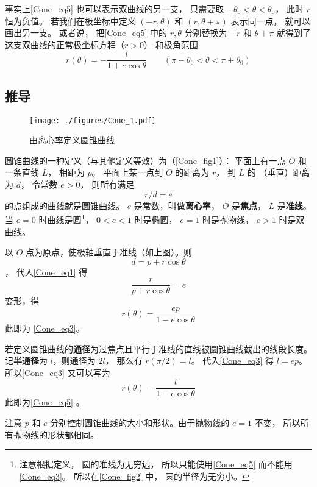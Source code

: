 事实上\autoref{Cone_eq5} 也可以表示双曲线的另一支， 只需要取 $-\theta_0< \theta < \theta_0$， 此时 $r$ 恒为负值。 若我们在极坐标中定义 $(-r, \theta)$ 和 $(r, \theta + \pi)$ 表示同一点， 就可以画出另一支。 或者说， 把\autoref{Cone_eq5} 中的  $r,\theta$ 分别替换为 $-r$ 和 $\theta+\pi$ 就得到了这支双曲线的正常极坐标方程（$r > 0$） 和极角范围
\begin{equation}\label{Cone_eq6}
r(\theta) = -\frac{l}{1 + e\cos\theta} \qquad (\pi - \theta_0<\theta < \pi + \theta_0)
\end{equation}

\subsection{推导}

\begin{figure}[ht]
\centering
\texttt{[image: ./figures/Cone\_1.pdf]}
\caption{由离心率定义圆锥曲线}\label{Cone_fig1}
\end{figure}

圆锥曲线的一种定义（与其他定义等效）为（\autoref{Cone_fig1}）：
平面上有一点 $O$ 和一条直线 $L$， 相距为 $p$。 
平面上某一点到 $O$ 的距离为 $r$， 到 $L$ 的
（垂直）距离为 $d$， 令常数 $e > 0$， 则所有满足
\begin{equation}\label{Cone_eq1}
r/d = e
\end{equation}
的点组成的曲线就是圆锥曲线。 $e$ 是常数，叫做\textbf{离心率}， $O$ 是\textbf{焦点}， $L$ 是\textbf{准线}。 当 $e = 0$ 时曲线是圆\footnote{注意根据定义， 圆的准线为无穷远， 所以只能使用\autoref{Cone_eq5} 而不能用\autoref{Cone_eq3}。 所以在\autoref{Cone_fig2} 中， 圆的半径为无穷小。}， $0 < e < 1$ 时是椭圆， $e = 1$ 时是抛物线， $e > 1$ 时是双曲线。

以 $O$ 点为原点，使极轴垂直于准线（如上图）。则 $$d = p + r \cos \theta $$， 代入\autoref{Cone_eq1} 得
\begin{equation}\label{Cone_eq2}
\frac{r}{p + r \cos \theta } = e
\end{equation}
变形，得
\begin{equation}
r(\theta) = \frac{ep}{1 - e\cos \theta }
\end{equation}
此即为 \autoref{Cone_eq3}。

若定义圆锥曲线的\textbf{通径}为过焦点且平行于准线的直线被圆锥曲线截出的线段长度。 记\textbf{半通径}为 $l$，则通径为 $2l$， 那么有 $r(\pi /2) = l$。 代入\autoref{Cone_eq3} 得 $l = ep$。 所以\autoref{Cone_eq3} 又可以写为
\begin{equation}\label{Cone_eq4}
r(\theta)  = \frac{l}{1 - e\cos \theta }
\end{equation}
此即为\autoref{Cone_eq5} 。

注意 $p$ 和 $e$ 分别控制圆锥曲线的大小和形状。由于抛物线的 $e = 1$ 不变， 所以所有抛物线的形状都相同。
